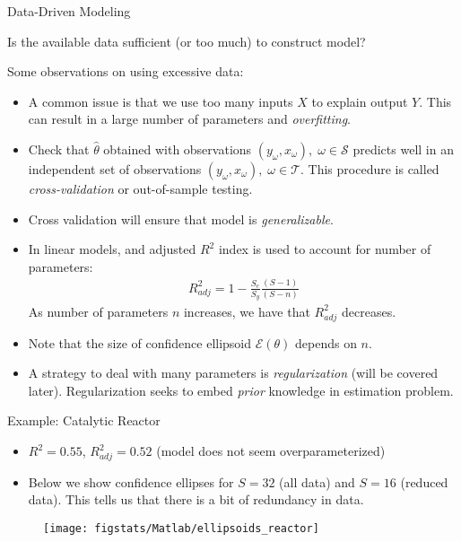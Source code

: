 \documentclass[9pt]{beamer}
\begin{document}
%
\begin{frame}{Data-Driven Modeling}

\begin{block}{}
Is the available data sufficient (or too much) to construct model?
\end{block}
Some observations on using excessive data:
\begin{itemize}
\item A common issue is that we use too many inputs $X$ to explain output $Y$. This can result in a large number of parameters and {\em overfitting}. 
\item Check that $\hat{\theta}$ obtained with observations $(y_\omega,x_\omega),\; \omega \in \mathcal{S}$ predicts well in an independent set of observations $(y_\omega,x_\omega),\; \omega \in \mathcal{T}$. This procedure is called {\em cross-validation} or out-of-sample testing. 
\item Cross validation will ensure that model is {\em generalizable}. 
\item In linear models, and adjusted $R^2$ index is used to account for number of parameters:
\begin{align*}
R^2_{adj}=1-\frac{S_e}{S_y}\frac{(S-1)}{(S-n)}
\end{align*}
As number of parameters $n$ increases, we have that $R^2_{adj}$ decreases. 
\item Note that the size of confidence ellipsoid $\mathcal{E}(\theta)$ depends on $n$.
\item A strategy to deal with many parameters is {\em regularization} (will be covered later). Regularization seeks to embed {\em prior} knowledge in estimation problem. 
\end{itemize}

\end{frame}

%
\begin{frame}{Example: Catalytic Reactor}

\begin{itemize}
\item $R^2=0.55$, $R^2_{adj}=0.52$ (model does not seem overparameterized)
\item Below we show confidence ellipses for $S=32$ (all data) and $S=16$ (reduced data). This tells us that there is a bit of redundancy in data. 
\end{itemize}

\begin{figure}[!htb]
    \centering
	\texttt{[image: figstats/Matlab/ellipsoids\_reactor]}
\end{figure}

\end{frame}
\end{document}
